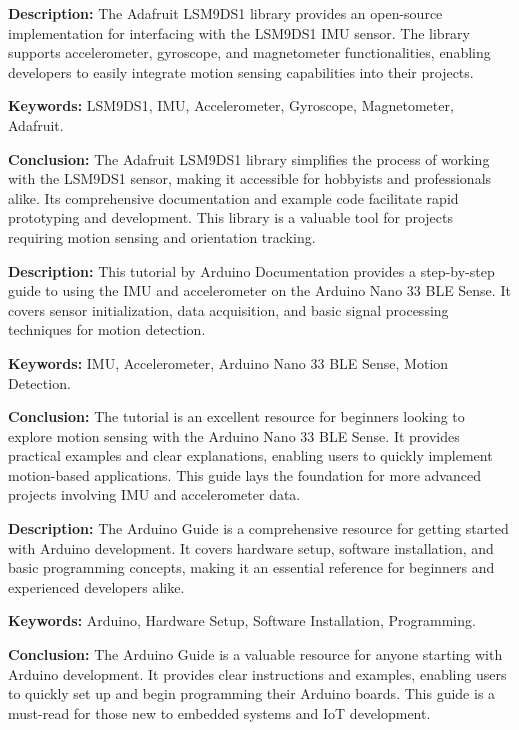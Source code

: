{
	\textbf{Description:} The Adafruit LSM9DS1 library provides an open-source implementation for interfacing with the LSM9DS1 IMU sensor. The library supports accelerometer, gyroscope, and magnetometer functionalities, enabling developers to easily integrate motion sensing capabilities into their projects.
	\newline
	
	\textbf{Keywords:} LSM9DS1, IMU, Accelerometer, Gyroscope, Magnetometer, Adafruit.
	
	\newpage
	\textbf{Conclusion:} The Adafruit LSM9DS1 library simplifies the process of working with the LSM9DS1 sensor, making it accessible for hobbyists and professionals alike. Its comprehensive documentation and example code facilitate rapid prototyping and development. This library is a valuable tool for projects requiring motion sensing and orientation tracking\cite{AdafruitLSM9DS1}.
}

{
	\textbf{Description:} This tutorial by Arduino Documentation provides a step-by-step guide to using the IMU and accelerometer on the Arduino Nano 33 BLE Sense. It covers sensor initialization, data acquisition, and basic signal processing techniques for motion detection.
	\newline
	
	\textbf{Keywords:} IMU, Accelerometer, Arduino Nano 33 BLE Sense, Motion Detection.
	
	\newpage
	\textbf{Conclusion:} The tutorial is an excellent resource for beginners looking to explore motion sensing with the Arduino Nano 33 BLE Sense. It provides practical examples and clear explanations, enabling users to quickly implement motion-based applications. This guide lays the foundation for more advanced projects involving IMU and accelerometer data\cite{Alushi2024}.
}

{
	\textbf{Description:} The Arduino Guide is a comprehensive resource for getting started with Arduino development. It covers hardware setup, software installation, and basic programming concepts, making it an essential reference for beginners and experienced developers alike.
	\newline
	
	\textbf{Keywords:} Arduino, Hardware Setup, Software Installation, Programming.
	
	\newpage
	\textbf{Conclusion:} The Arduino Guide is a valuable resource for anyone starting with Arduino development. It provides clear instructions and examples, enabling users to quickly set up and begin programming their Arduino boards. This guide is a must-read for those new to embedded systems and IoT development\cite{ArduinoGuide:2025}.
}

